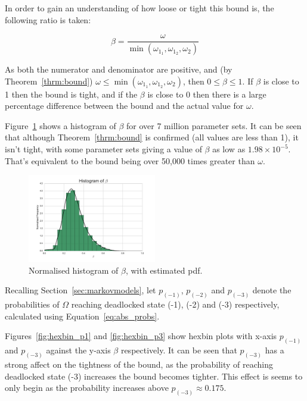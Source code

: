 \documentclass{article}
\numberwithin{equation}{section}
\begin{document}
In order to gain an understanding of how loose or tight this bound is, the
following ratio is taken:

\begin{equation}
\beta = \frac{\omega}{\min(\omega_{1_1}, \omega_{1_2}, \omega_2)}
\end{equation}

As both the numerator and denominator are positive, and (by
Theorem~\ref{thrm:bound}) $\omega \leq \min(\omega_{1_1}, \omega_{1_2},
\omega_2)$, then $0 \leq \beta \leq 1$.
If $\beta$ is close to 1 then the bound is tight, and if the $\beta$ is close
to 0 then there is a large percentage difference between the bound and the
actual value for $\omega$.

Figure~\ref{fig:bound_ratio_hist} shows a histogram of $\beta$ for over 7
million parameter sets.
It can be seen that although Theorem~\ref{thrm:bound} is confirmed (all values
are less than 1), it isn't tight, with some parameter sets giving a value of
$\beta$ as low as $1.98 \times 10^{-5}$.
That's equivalent to the bound being over 50,000 times greater than $\omega$.

\begin{figure}[!htbp]
  \begin{center}
  \includegraphics[width=0.5\textwidth]{images/ratio_actual_bound}
  \end{center}
  \caption{Normalised histogram of $\beta$, with estimated pdf.}
  \label{fig:bound_ratio_hist}
\end{figure}

Recalling Section~\ref{sec:markovmodels}, let $p_{(-1)}$, $p_{(-2)}$ and
$p_{(-3)}$ denote the probabilities of $\Omega$ reaching deadlocked state
(-1), (-2) and (-3) respectively, calculated using Equation~\ref{eq:abs_probs}.

Figures~\ref{fig:hexbin_p1} and \ref{fig:hexbin_p3} show hexbin plots with
x-axis $p_{(-1)}$ and $p_{(-3)}$ against the y-axis $\beta$ respectively.
It can be seen that $p_{(-3)}$ has a strong affect on the tightness of the
bound, as the probability of reaching deadlocked state (-3) increases the
bound becomes tighter.
This effect is seems to only begin as the probability increases above
$p_{(-3)} \approx 0.175$.
\end{document}
